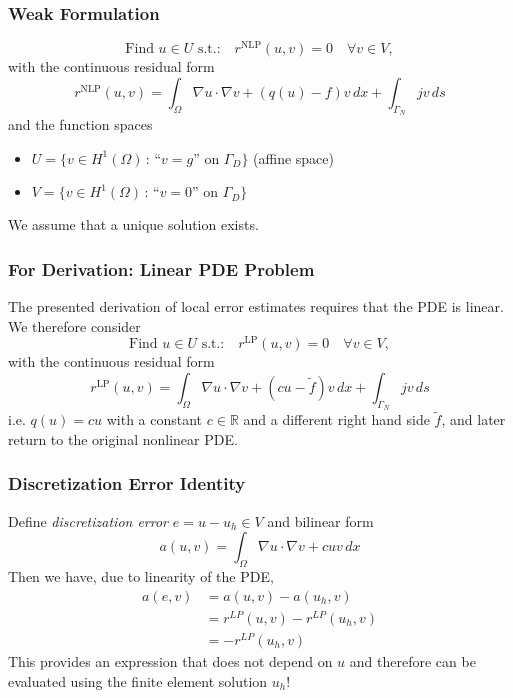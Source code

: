 \documentclass[ignorenonframetext,11pt]{beamer}
\theoremstyle{definition}
\begin{document}
\begin{frame}
\frametitle{Weak Formulation}
\begin{equation*}
\text{Find $u\in U$ s.t.:} \quad r^{\text{NLP}}(u,v)=0 \quad \forall v\in V,
\end{equation*}
with the continuous residual form
\begin{equation*}
r^{\text{NLP}}(u,v) = \int_\Omega \nabla u \cdot \nabla v + (q(u)-f)v\,dx + \int_{\Gamma_N} jv\,ds
\end{equation*}
and the function spaces 
\begin{itemize}
\item $U= \{v\in H^1(\Omega) \,:\, \text{``$v=g$'' on $\Gamma_D$}\}$ (affine space)
\item $V= \{v\in H^1(\Omega) \,:\, \text{``$v=0$'' on $\Gamma_D$}\}$
\end{itemize}
We assume that a unique solution exists.
\end{frame}

\begin{frame}
\frametitle{For Derivation: Linear PDE Problem}
The presented derivation of local error estimates requires that the PDE is linear.
We therefore consider
\begin{equation*}
\text{Find $u\in U$ s.t.:} \quad r^{\text{LP}}(u,v)=0 \quad \forall v\in V,
\label{Eq:BasicBuildingBlock}
\end{equation*}
with the continuous residual form
\begin{equation*}
  r^{\text{LP}}(u,v) = \int_\Omega \nabla u \cdot \nabla v + (cu-\tilde{f})v\,dx + \int_{\Gamma_N} jv\,ds
\end{equation*}
i.e. $q(u) = c u$ with a constant $c \in \mathbb{R}$ and a different right hand
side $\tilde{f}$, and later return to the original nonlinear PDE.
\end{frame}

\begin{frame}
\frametitle{Discretization Error Identity}
Define \emph{discretization error} $e = u - u_h \in V$ and bilinear form
\begin{equation*}
  a(u,v) = \int_\Omega \nabla u \cdot \nabla v + c u v \,dx
\end{equation*}
Then we have, due to linearity of the PDE,
\begin{align*}
  a(e,v) &= a(u,v) - a(u_h,v) \\
  &= r^{LP}(u,v) - r^{LP}(u_h,v) \\
  &= - r^{LP}(u_h,v)
\end{align*}
This provides an expression that does not depend on $u$ and therefore can be
evaluated using the finite element solution $u_h$!
\end{frame}
\end{document}
